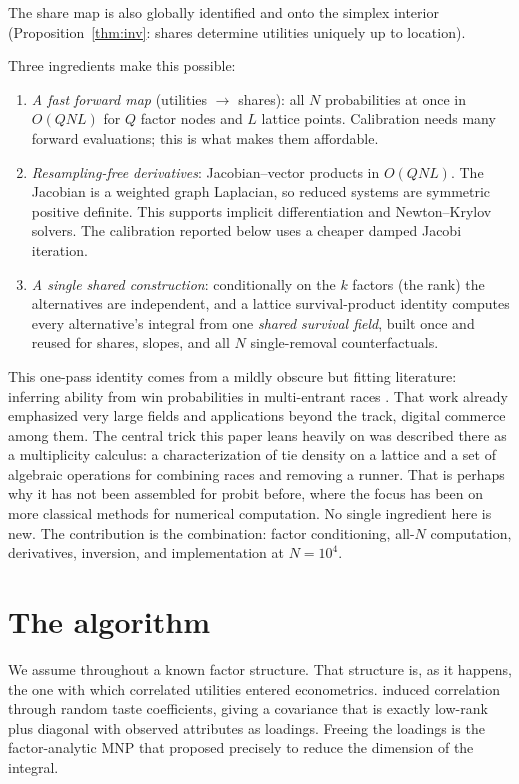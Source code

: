 \documentclass[12pt]{article}
\theoremstyle{remark}
\begin{document}
The share map is also globally identified and onto the simplex interior
(Proposition~\ref{thm:inv}: shares determine utilities uniquely up to
location). 

Three ingredients make this possible: 

\begin{enumerate}
\item \emph{A fast forward map} (utilities $\to$ shares): all $N$
probabilities at once in $O(QNL)$ for $Q$ factor nodes and $L$ lattice
points. Calibration needs many forward evaluations; this is what makes
them affordable.
\item \emph{Resampling-free derivatives}: Jacobian--vector products in
$O(QNL)$. The Jacobian is a weighted graph
Laplacian, so reduced systems are symmetric positive definite. This supports
implicit differentiation and Newton--Krylov solvers. The calibration
reported below uses a cheaper damped Jacobi iteration.
\item \emph{A single shared construction}: conditionally on the $k$
factors (the rank) the alternatives are independent, and a lattice survival-product
identity computes every alternative's integral from one \emph{shared
survival field}, built once and reused for shares, slopes, and all $N$
single-removal counterfactuals.
\end{enumerate}

This one-pass identity comes from a mildly obscure but fitting literature: inferring ability
from win probabilities in multi-entrant races \citep{cotton2021}. That
work already emphasized very large fields and applications beyond the
track, digital commerce among them. The central trick this paper
leans heavily on was described there as a multiplicity calculus: a characterization of tie density 
on a lattice and a set of algebraic operations for combining races and removing a runner. That is
perhaps why it has not been assembled for probit before, where the focus has been on more classical methods
for numerical computation. No single ingredient here is new. The contribution is the
combination: factor conditioning, all-$N$ computation, derivatives,
inversion, and implementation at $N = 10^4$.

\section{The algorithm}\label{sec:algorithm}

We assume throughout a known factor structure. That structure is, as
it happens, the one with which correlated utilities entered
econometrics. \citet{hausman1978} induced correlation
through random taste coefficients, giving a covariance that is exactly
low-rank plus diagonal with observed attributes as loadings. Freeing the
loadings is the factor-analytic MNP that \citet{mcfadden1984} proposed
precisely to reduce the dimension of the integral. 
\end{document}
